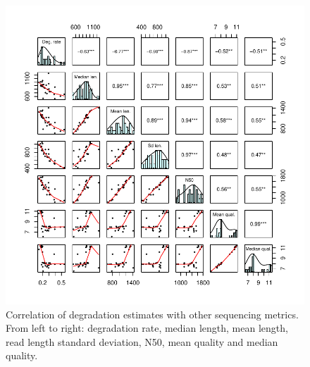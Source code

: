 \begin{figure}[p]
    \centering
    \includegraphics[width=\textwidth]{figures/pwcor.pdf}
    \caption[Correlation of degradation estimates with other sequencing metrics]{Correlation of degradation estimates with other sequencing metrics. From left to right: degradation rate, median length, mean length, read length standard deviation, N50, mean quality and median quality.}
    \label{fig:pwcor}
\end{figure}


